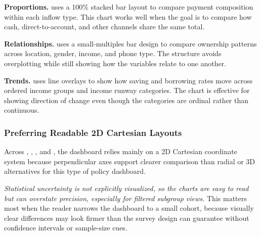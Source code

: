 \documentclass[../main.tex]{subfiles}
\begin{document}
\textbf{Proportions.} 
uses a 100\% stacked bar layout to compare payment composition within each
inflow type. This chart works well when the goal is to compare how cash,
direct-to-account, and other channels share the same total.

\textbf{Relationships.} 
uses a small-multiples bar design to compare ownership patterns across
location, gender, income, and phone type. The structure avoids overplotting
while still showing how the variables relate to one another.

\textbf{Trends.} 
uses line overlays to show how saving and borrowing rates move across ordered
income groups and income runway categories. The chart is effective for showing
direction of change even though the categories are ordinal rather than
continuous.

\subsubsection{Preferring Readable 2D Cartesian Layouts}

Across ,
,
, and
, the
dashboard relies mainly on a 2D Cartesian coordinate system because
perpendicular axes support clearer comparison than radial or 3D alternatives
for this type of policy dashboard.

\noindent\textit{Statistical uncertainty is not explicitly visualized, so the
charts are easy to read but can overstate precision, especially for filtered
subgroup views.} This matters most when the reader narrows the dashboard to a
small cohort, because visually clear differences may look firmer than the
survey design can guarantee without confidence intervals or sample-size cues.
\end{document}
